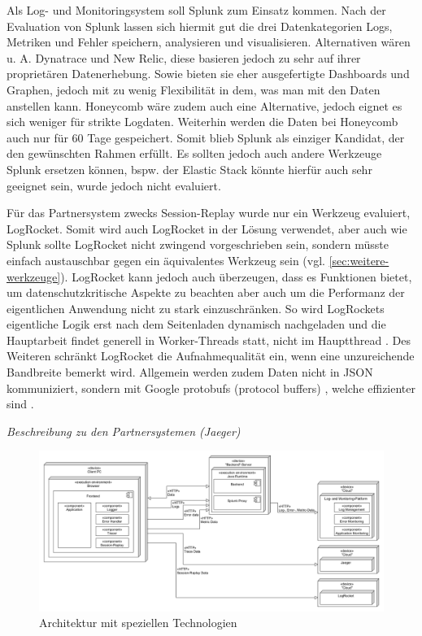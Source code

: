 	Als Log- und Monitoringsystem soll Splunk zum Einsatz kommen. Nach der Evaluation von Splunk lassen sich hiermit gut die drei Datenkategorien Logs, Metriken und Fehler speichern, analysieren und visualisieren. Alternativen wären u. A. Dynatrace und New Relic, diese basieren jedoch zu sehr auf ihrer proprietären Datenerhebung. Sowie bieten sie eher ausgefertigte Dashboards und Graphen, jedoch mit zu wenig Flexibilität in dem, was man mit den Daten anstellen kann. Honeycomb wäre zudem auch eine Alternative, jedoch eignet es sich weniger für strikte Logdaten. Weiterhin werden die Daten bei Honeycomb auch nur für 60 Tage gespeichert. Somit blieb Splunk als einziger Kandidat, der den gewünschten Rahmen erfüllt. Es sollten jedoch auch andere Werkzeuge Splunk ersetzen können, bspw. der Elastic Stack könnte hierfür auch sehr geeignet sein, wurde jedoch nicht evaluiert.
	
	Für das Partnersystem zwecks Session-Replay wurde nur ein Werkzeug evaluiert, LogRocket. Somit wird auch LogRocket in der Lösung verwendet, aber auch wie Splunk sollte LogRocket nicht zwingend vorgeschrieben sein, sondern müsste einfach austauschbar gegen ein äquivalentes Werkzeug sein (vgl. \autoref{sec:weitere-werkzeuge}). LogRocket kann jedoch auch überzeugen, dass es Funktionen bietet, um datenschutzkritische Aspekte zu beachten aber auch um die Performanz der eigentlichen Anwendung nicht zu stark einzuschränken. So wird LogRockets eigentliche Logik erst nach dem Seitenladen dynamisch nachgeladen und die Hauptarbeit findet generell in Worker-Threads statt, nicht im Hauptthread \cite{LogRocketPerformance}. Des Weiteren schränkt LogRocket die Aufnahmequalität ein, wenn eine unzureichende Bandbreite bemerkt wird. Allgemein werden zudem Daten nicht in JSON kommuniziert, sondern mit Google protobufs (protocol buffers) \cite{GoogleProtobufs}, welche effizienter sind \citationneeded. %
	
	\textit{\color{red}Beschreibung zu den Partnersystemen (Jaeger)}
	
\begin{figure}[H]
	\centering
	\includegraphics[width=0.75\linewidth]{img/04_erstellung-poc/konzept-technologien.png}
	\caption{Architektur mit speziellen Technologien}
	\label{fig:architektur-technologien}
\end{figure}

